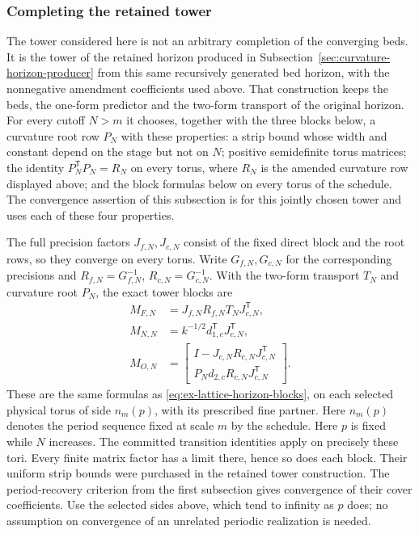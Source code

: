 \subsubsection{Completing the retained tower}
The tower considered here is not an arbitrary completion of the
converging beds. It is the tower of the retained horizon produced in
Subsection~\ref{sec:curvature-horizon-producer} from this same
recursively generated bed horizon, with the nonnegative amendment
coefficients used above. That construction keeps the beds, the
one-form predictor and the two-form transport of the original horizon.
For every cutoff $N>m$ it chooses, together with the three blocks
below, a curvature root row $P_N$ with these properties: a strip
bound whose width and constant depend on the stage but not on $N$;
positive semidefinite torus matrices; the identity
$P_N^{\mathsf T}P_N=R_N$ on every torus, where $R_N$ is the amended
curvature row displayed above; and the block formulas below on every
torus of the schedule. The convergence assertion of this subsection
is for this jointly chosen tower and uses each of these four
properties.

The full precision factors $J_{f,N},J_{c,N}$ consist of the fixed
direct block and the root rows, so they converge on every torus.
Write $G_{f,N},G_{c,N}$ for the corresponding precisions and
$R_{f,N}=G_{f,N}^{-1}$, $R_{c,N}=G_{c,N}^{-1}$. With the two-form
transport $T_N$ and curvature root $P_N$, the exact tower blocks are
\begin{align*}
 M_{F,N}&=J_{f,N}R_{f,N}T_NJ_{c,N}^{\mathsf T},\\
 M_{N,N}&=k^{-1/2}d_{1,c}^{\mathsf T}J_{c,N}^{\mathsf T},\\
 M_{O,N}&=
 \begin{bmatrix}
 I-J_{c,N}R_{c,N}J_{c,N}^{\mathsf T}\\
 P_Nd_{2,c}R_{c,N}J_{c,N}^{\mathsf T}
 \end{bmatrix}.
\end{align*}
These are the same formulas as
\eqref{eq:ex-lattice-horizon-blocks}, on each selected physical torus
of side $n_m(p)$, with its prescribed fine partner. Here $n_m(p)$
denotes the period sequence fixed at scale $m$ by the schedule.
Here $p$ is fixed while $N$ increases. The committed transition
identities apply on precisely these tori. Every finite matrix factor
has a limit there, hence so does each block. Their
uniform strip bounds were purchased in the retained tower
construction. The period-recovery criterion from the first
subsection gives convergence of their cover coefficients. Use the selected sides above, which tend to infinity as $p$ does;
no assumption on convergence of an unrelated periodic realization
is needed.

